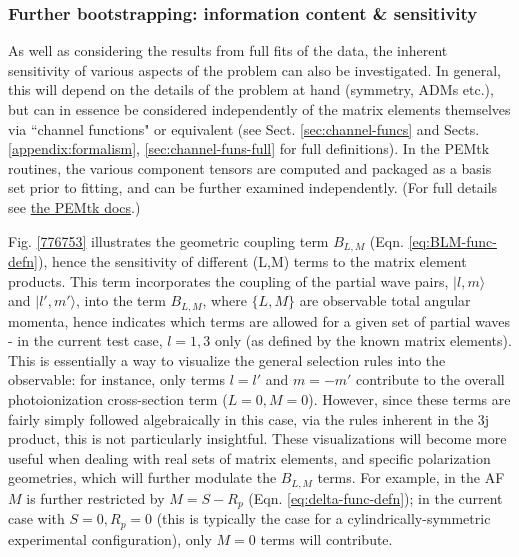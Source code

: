 \documentclass[10pt]{article}
\begin{document}
\subsubsection{Further bootstrapping: information content \& sensitivity\label{sec:bootstrapping-info-sensitivity}}

As well as considering the results from full fits of the data, the inherent sensitivity of various aspects of the problem can also be investigated. In general, this will depend on the details of the problem at hand (symmetry, ADMs etc.), but can in essence be considered independently of the matrix elements themselves via ``channel functions" or equivalent (see Sect. \ref{sec:channel-funcs} and Sects. \ref{appendix:formalism}, \ref{sec:channel-funs-full} for full definitions). In the PEMtk routines, the various component tensors are computed and packaged as a basis set prior to fitting, and can be further examined independently. (For full details see \href{https://pemtk.readthedocs.io/en/latest/fitting/PEMtk_fitting_basis-set_demo_050621-full.html}{the PEMtk docs}.)

Fig. \ref{776753} illustrates the geometric coupling term $B_{L,M}$ (Eqn. \ref{eq:BLM-func-defn}), hence the sensitivity of different (L,M) terms to the matrix element products. This term incorporates the coupling of the partial wave pairs, $|l,m\rangle$ and $|l',m'\rangle$, into the term $B_{L,M}$, where $\{L,M\}$ are observable total angular momenta, 
hence indicates which terms are allowed for a given set of partial waves - in the current test case, $l=1,3$ only (as defined by the known matrix elements). This is essentially a way to visualize the general selection rules into the observable: for instance, only terms $l=l'$ and $m=-m'$ contribute to the overall photoionization cross-section term ($L=0, M=0$). However, since these terms are fairly simply followed algebraically in this case, via the rules inherent in the 3j product, this is not particularly insightful. These visualizations will become more useful when dealing with real sets of matrix elements, and specific polarization geometries, which will further modulate the $B_{L,M}$ terms. For example, in the AF $M$ is further restricted by $M = S-R_{p}$ (Eqn. \ref{eq:delta-func-defn}); in the current case with $S=0, R_p=0$ (this is typically the case for a cylindrically-symmetric experimental configuration), only $M=0$ terms will contribute.
\end{document}
